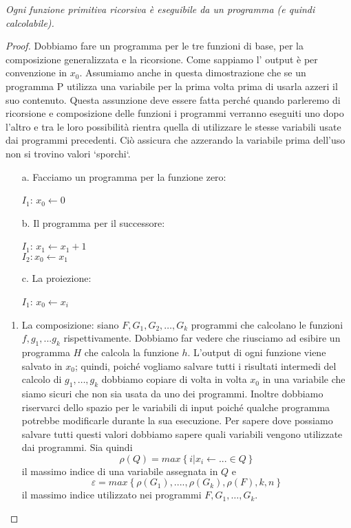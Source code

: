 \begin{thm}
\emph{Ogni funzione primitiva ricorsiva è eseguibile da un programma
(e quindi calcolabile).}\end{thm}
\begin{proof}
Dobbiamo fare un programma per le tre funzioni di base, per la
composizione generalizzata e la ricorsione. Come sappiamo l' output è
per convenzione in $x_{0}$. Assumiamo anche in questa dimostrazione che 
se un programma P utilizza una variabile per la prima volta prima di usarla
azzeri il suo contenuto. Questa assunzione deve essere fatta perché
quando parleremo di ricorsione e composizione delle funzioni 
i programmi verranno eseguiti uno dopo l'altro e tra le loro possibilità rientra quella 
di utilizzare le stesse variabili usate dai programmi precedenti. Ciò assicura
che azzerando la variabile prima dell'uso non si trovino valori `sporchi`.

\begin{itemize}
\item[a.] Facciamo un programma per la funzione zero:
\begin{mylisting}
$I_1$: $x_{0}\leftarrow0$
\end{mylisting}

\item[b.] Il programma per il successore:\begin{mylisting}$I_1$:
  $x_{1}\leftarrow x_{1}+1$ \\$I_2:x_{0}\leftarrow x_{1} $\end{mylisting}

\item[c.] La proiezione:\begin{mylisting}$I_1$: $x_{0}\longleftarrow
  x_{i}$\end{mylisting}
\end{itemize}

\begin{enumerate}
\item La composizione: siano $F, G_1, G_2, \dots, G_k$ programmi che calcolano
  le funzioni $f,g_{1},...g_{k}$ rispettivamente. Dobbiamo far vedere che
  riusciamo ad esibire un programma $H$ che calcola la funzione $h$.
  L'output di ogni
  funzione viene salvato in $x_{0}$; quindi, poich\'e vogliamo salvare
  tutti i risultati intermedi del calcolo di $g_{1},\dots,g_{k}$
  dobbiamo copiare di volta in volta $x_0$ in una variabile che siamo
  sicuri che non sia usata da uno dei programmi. Inoltre dobbiamo
  riservarci dello spazio per le variabili di input poich\'e qualche
  programma potrebbe modificarle durante la sua esecuzione.  Per
  sapere dove possiamo salvare tutti questi valori dobbiamo sapere
  quali variabili vengono utilizzate dai programmi.
  Sia quindi
  $$\rho(Q)=max\left\{ i|x_{i}\leftarrow...\in Q\right\}$$
  il massimo indice di una variabile assegnata in $Q$ e
  $$\varepsilon=max\left\{
  \rho(G_{1}),....,\rho(G_{k}),\rho(F),k,n\right\}$$
  il massimo indice utilizzato nei programmi $F, G_1, \dots, G_k$.


\end{enumerate}
\end{proof}
